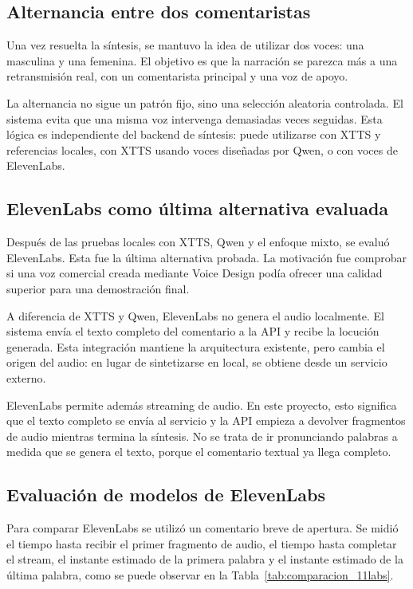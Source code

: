 \subsection{Alternancia entre dos comentaristas}

Una vez resuelta la síntesis, se mantuvo la idea de utilizar dos voces: una masculina y una femenina. El objetivo es que la narración se parezca más a una retransmisión real, con un comentarista principal y una voz de apoyo.

La alternancia no sigue un patrón fijo, sino una selección aleatoria controlada. El sistema evita que una misma voz intervenga demasiadas veces seguidas. Esta lógica es independiente del backend de síntesis: puede utilizarse con XTTS y referencias locales, con XTTS usando voces diseñadas por Qwen, o con voces de ElevenLabs.

\subsection{ElevenLabs como última alternativa evaluada}

Después de las pruebas locales con XTTS, Qwen y el enfoque mixto, se evaluó ElevenLabs. Esta fue la última alternativa probada. La motivación fue comprobar si una voz comercial creada mediante Voice Design podía ofrecer una calidad superior para una demostración final.

A diferencia de XTTS y Qwen, ElevenLabs no genera el audio localmente. El sistema envía el texto completo del comentario a la API y recibe la locución generada. Esta integración mantiene la arquitectura existente, pero cambia el origen del audio: en lugar de sintetizarse en local, se obtiene desde un servicio externo.

ElevenLabs permite además streaming de audio. En este proyecto, esto significa que el texto completo se envía al servicio y la API empieza a devolver fragmentos de audio mientras termina la síntesis. No se trata de ir pronunciando palabras a medida que se genera el texto, porque el comentario textual ya llega completo.

\subsection{Evaluación de modelos de ElevenLabs}

Para comparar ElevenLabs se utilizó un comentario breve de apertura. Se midió el tiempo hasta recibir el primer fragmento de audio, el tiempo hasta completar el stream, el instante estimado de la primera palabra y el instante estimado de la última palabra, como se puede observar en la Tabla~\ref{tab:comparacion_11labs}.

